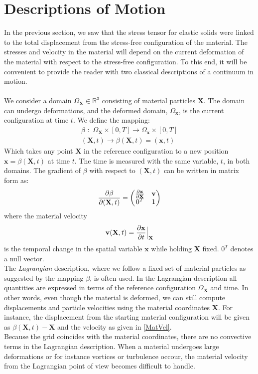 \section{Descriptions of Motion}
In the previous section, we saw that the stress tensor for elastic solids were linked to the total displacement from the stress-free configuration of the material. The stresses and velocity in the material will depend on the current deformation of the material with respect to the stress-free configuration. To this end, it will be convenient to provide the reader with two classical descriptions of a continuum in motion. 
\\
\\
We consider a domain $\Omega_{\mathbf{X}} \in \mathbb{R}^3$ consisting of material particles $\mathbf{X}$. The domain can undergo deformations, and the deformed domain, $\Omega_{\mathbf{x}}$, is the current configuration at time $t$. We define the mapping:
\begin{align}
\beta \,\, : \,\, \Omega_{\mathbf{X}} \times [0,T] \rightarrow  \Omega_{\mathbf{x}} \times [0,T] \\
(\mathbf{X},t) \rightarrow \beta(\mathbf{X},t) = (\mathbf{x},t)
\end{align}
Which takes any point $\mathbf{X}$ in the reference configuration to a new position $\mathbf{x} = \beta(\mathbf{X},t)$ at time $t$. The time is measured with the same variable, $t$, in both domains. The gradient of $\beta$ with respect to $(\mathbf{X},t)$ can be written in matrix form as:
\begin{align}
\frac{\partial \beta}{\partial (\mathbf{X},t)} = \begin{pmatrix} \frac{\partial \mathbf{x}}{\partial \mathbf{X}} & \mathbf{v} \\
											0^T & 1
								\end{pmatrix} \label{betaGradient}
\end{align}
where the material velocity
\begin{align} \mathbf{v}(\mathbf{X},t) = \frac{\partial \mathbf{x}}{\partial t}\Big{|}_{\mathbf{X}} \label{MatVel}
\end{align}
is the temporal change in the spatial variable $\mathbf{x}$ while holding \textbf{X} fixed. $0^T$ denotes a null vector. 
\\
The \textit{Lagrangian} description, where we follow a fixed set of material particles as suggested by the mapping $\beta$, is often used. In the Lagrangian description all quantities are expressed in terms of the reference configuration $\Omega_{\mathbf{X}}$ and time. In other words, even though the material is deformed, we can still compute displacements and particle velocities using the material coordinates $\mathbf{X}$. For instance, the displacement from the starting material configuration will be given as $\beta(\mathbf{X},t) - \mathbf{X}$ and the velocity as given in \eqref{MatVel}. \\ Because the grid coincides with the material coordinates, there are no convective terms in the Lagrangian description. When a material undergoes large deformations or for instance vortices or turbulence occour, the material velocity from the Lagrangian point of view becomes difficult to handle. 
